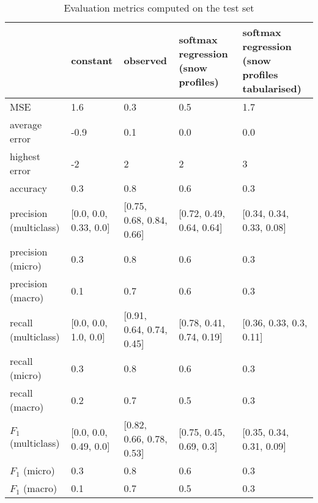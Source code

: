 \begin{table}[H]
\caption{Evaluation metrics computed on the test set}
\label{tbl:sais_eval_test}
\begin{tabular}{lllll}
\toprule
 & constant & observed & softmax regression (snow profiles) & softmax regression (snow profiles tabularised) \\
\midrule
MSE & 1.6 & 0.3 & 0.5 & 1.7 \\
average error & -0.9 & 0.1 & 0.0 & 0.0 \\
highest error & -2 & 2 & 2 & 3 \\
accuracy & 0.3 & 0.8 & 0.6 & 0.3 \\
precision (multiclass) & [0.0, 0.0, 0.33, 0.0] & [0.75, 0.68, 0.84, 0.66] & [0.72, 0.49, 0.64, 0.64] & [0.34, 0.34, 0.33, 0.08] \\
precision (micro) & 0.3 & 0.8 & 0.6 & 0.3 \\
precision (macro) & 0.1 & 0.7 & 0.6 & 0.3 \\
recall (multiclass) & [0.0, 0.0, 1.0, 0.0] & [0.91, 0.64, 0.74, 0.45] & [0.78, 0.41, 0.74, 0.19] & [0.36, 0.33, 0.3, 0.11] \\
recall (micro) & 0.3 & 0.8 & 0.6 & 0.3 \\
recall (macro) & 0.2 & 0.7 & 0.5 & 0.3 \\
$F_1$ (multiclass) & [0.0, 0.0, 0.49, 0.0] & [0.82, 0.66, 0.78, 0.53] & [0.75, 0.45, 0.69, 0.3] & [0.35, 0.34, 0.31, 0.09] \\
$F_1$ (micro) & 0.3 & 0.8 & 0.6 & 0.3 \\
$F_1$ (macro) & 0.1 & 0.7 & 0.5 & 0.3 \\
\bottomrule
\end{tabular}
\end{table}
